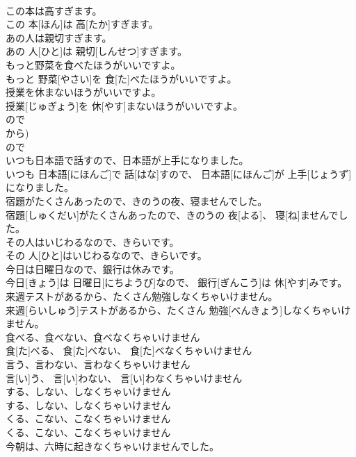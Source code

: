 \documentclass[8pt]{extreport}
\begin{document}
\begin{CJK}{UTF8}{min}
\\	この本は高すぎます。	
\\	この 本[ほん]は 高[たか]すぎます。	
\\	あの人は親切すぎます。	
\\	あの 人[ひと]は 親切[しんせつ]すぎます。	
\\	もっと野菜を食べたほうがいいですよ。	
\\	もっと 野菜[やさい]を 食[た]べたほうがいいですよ。	
\\	授業を休まないほうがいいですよ。	
\\	授業[じゅぎょう]を 休[やす]まないほうがいいですよ。	
\\	ので 
\\	から)	
\\	ので
\\	いつも日本語で話すので、日本語が上手になりました。	
\\	いつも 日本語[にほんご]で 話[はな]すので、 日本語[にほんご]が 上手[じょうず]になりました。	
\\	宿題がたくさんあったので、きのうの夜、寝ませんでした。	
\\	宿題[しゅくだい]がたくさんあったので、きのうの 夜[よる]、 寝[ね]ませんでした。	
\\	その人はいじわるなので、きらいです。	
\\	その 人[ひと]はいじわるなので、きらいです。	
\\	今日は日曜日なので、銀行は休みです。	
\\	今日[きょう]は 日曜日[にちようび]なので、 銀行[ぎんこう]は 休[やす]みです。	
\\	来週テストがあるから、たくさん勉強しなくちゃいけません。	
\\	来週[らいしゅう]テストがあるから、たくさん 勉強[べんきょう]しなくちゃいけません。	
\\	食べる、食べない、食べなくちゃいけません	
\\	食[た]べる、 食[た]べない、 食[た]べなくちゃいけません	
\\	言う、言わない、言わなくちゃいけません	
\\	言[い]う、 言[い]わない、 言[い]わなくちゃいけません	
\\	する、しない、しなくちゃいけません	
\\	する、しない、しなくちゃいけません	
\\	くる、こない、こなくちゃいけません	
\\	くる、こない、こなくちゃいけません	
\\	今朝は、六時に起きなくちゃいけませんでした。	

\end{CJK}
\end{document}
